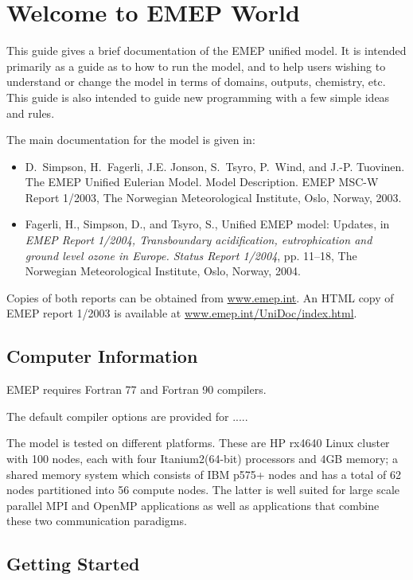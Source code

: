 \chapter{Welcome to EMEP World}

This guide gives a brief documentation of the EMEP unified model.
It is intended primarily as a guide as to how to run the model, and
to help users wishing to understand or change 
the model in terms of domains, outputs, chemistry, etc.
This guide is also intended to guide new programming with a few
simple ideas and rules.

The main documentation for the model is given in:

\begin{itemize}
\item
D.~Simpson, H.~Fagerli, J.E. Jonson, S.~Tsyro, P.~Wind, and J.-P. Tuovinen.
{The EMEP Unified Eulerian Model. Model Description}.
EMEP MSC-W Report 1/2003, The Norwegian
Meteorological Institute, Oslo, Norway, 2003.
\item
Fagerli, H., Simpson, D., and Tsyro, S., {Unified EMEP model: Updates}, in {\em
  EMEP Report 1/2004, Transboundary acidification, eutrophication and ground
  level ozone in Europe. Status Report 1/2004\/}, pp. 11--18, The Norwegian
  Meteorological Institute, Oslo, Norway, 2004.
\end{itemize}

Copies of both reports can be obtained from \url{www.emep.int}. An HTML
copy of EMEP report 1/2003 is available at \url{www.emep.int/UniDoc/index.html}.


\section{Computer Information}

EMEP requires Fortran 77 and Fortran 90 compilers.  

The default compiler options are provided for .....

The model is tested on different platforms.  These are HP rx4640 Linux
cluster with 100 nodes, each with four Itanium2(64-bit) processors and
4GB memory; a shared memory system which consists of IBM p575+ nodes
and has a total of 62 nodes partitioned into 56 compute nodes. The
latter is well suited for large scale parallel MPI and OpenMP
applications as well as applications that combine these two
communication paradigms.   

\section{Getting Started}

